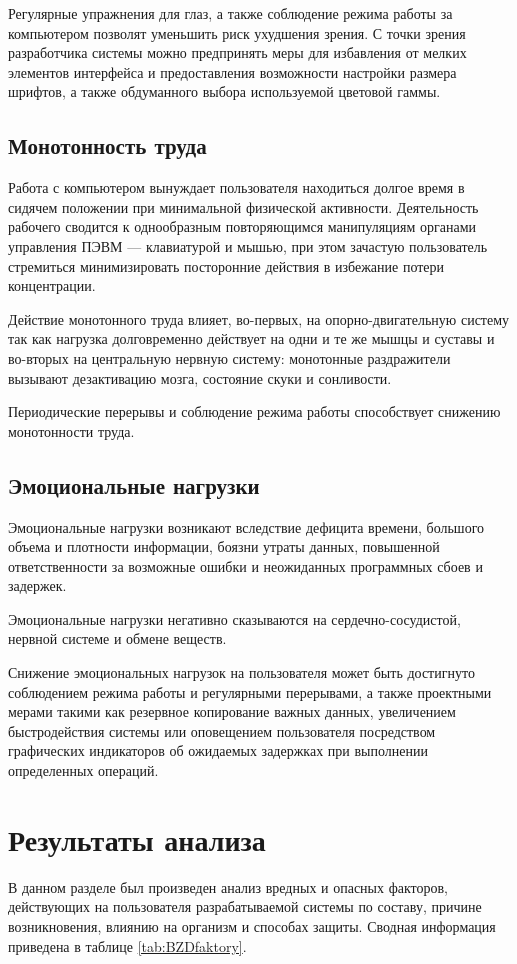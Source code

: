 \documentclass[14pt,oneside,final]{extreport}
\begin{document}
	Регулярные упражнения для глаз, а также соблюдение режима работы за компьютером позволят уменьшить риск ухудшения зрения. С точки зрения разработчика системы можно предпринять меры для избавления от мелких элементов интерфейса и предоставления возможности настройки размера шрифтов, а также обдуманного выбора используемой цветовой гаммы. 
	\subsection{Монотонность труда}
	Работа с компьютером вынуждает пользователя находиться долгое время в сидячем положении при минимальной физической активности. Деятельность рабочего сводится к однообразным повторяющимся манипуляциям органами управления  ПЭВМ --- клавиатурой и мышью, при этом зачастую пользователь стремиться минимизировать посторонние действия в избежание потери концентрации. 

	Действие монотонного труда влияет, во-первых, на опорно-двигательную систему так как нагрузка долговременно действует на одни и те же мышцы и суставы  и во-вторых на центральную нервную систему: монотонные раздражители вызывают дезактивацию мозга, состояние скуки и сонливости.   
	
	Периодические перерывы и соблюдение режима работы способствует снижению монотонности труда.
	
	\subsection{Эмоциональные нагрузки}
	Эмоциональные нагрузки возникают вследствие дефицита времени, большого объема и плотности информации, боязни утраты данных, повышенной ответственности за возможные ошибки и неожиданных программных сбоев и задержек.  
	
	Эмоциональные нагрузки негативно сказываются на сердечно-сосудистой, нервной системе и обмене веществ. 
	
	Снижение эмоциональных нагрузок на пользователя может быть достигнуто соблюдением режима работы и регулярными перерывами, а также проектными мерами такими как резервное копирование важных данных, увеличением быстродействия системы или оповещением пользователя посредством графических индикаторов об ожидаемых задержках при выполнении определенных операций.
	\section{Результаты анализа}
	В данном разделе был произведен анализ вредных и опасных факторов, действующих на пользователя разрабатываемой системы по составу, причине возникновения, влиянию на организм и способах защиты. Сводная информация приведена в таблице \ref{tab:BZDfaktory}.
\end{document}
